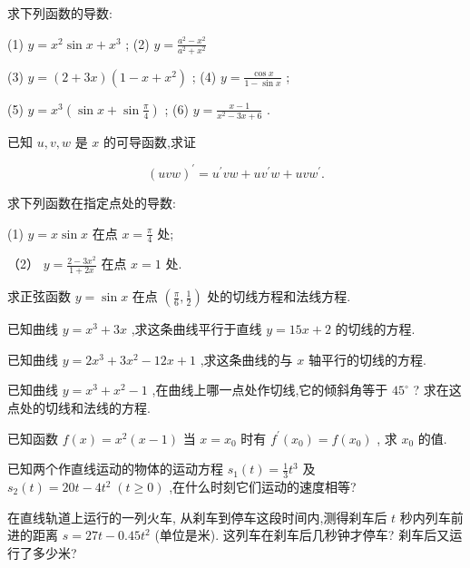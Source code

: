 \documentclass[lang=cn,newtx,10pt,scheme=chinese]{elegantbook}
\begin{document}
\begin{problemset}[习 题 五]

\item 求下列函数的导数:

(1) \(y = {x}^{2}\sin x + {x}^{3}\) ; (2) \(y = \frac{{a}^{2} - {x}^{2}}{{a}^{2} + {x}^{2}}\)

(3) \(y = \left( {2 + {3x}}\right) \left( {1 - x + {x}^{2}}\right)\) ; (4) \(y = \frac{\cos x}{1 - \sin x}\) ;

(5) \(y = {x}^{3}\left( {\sin x + \sin \frac{\pi }{4}}\right)\) ; (6) \(y = \frac{x - 1}{{x}^{2} - {3x} + 6}\) .

\item 已知 \(u,v,w\) 是 \(x\) 的可导函数,求证

\[
{\left( uvw\right) }^{\prime } = {u}^{\prime }{vw} + u{v}^{\prime }w + {uv}{w}^{\prime }.
\]

\item 求下列函数在指定点处的导数:

(1) \(y = x\sin x\) 在点 \(x = \frac{\pi }{4}\) 处;

（2） \(y = \frac{2 - 3{x}^{2}}{1 + {2x}}\) 在点 \(x = 1\) 处.

\item 求正弦函数 \(y = \sin x\) 在点 \(\left( {\frac{\pi }{6},\frac{1}{2}}\right)\) 处的切线方程和法线方程.

\item 已知曲线 \(y = {x}^{3} + {3x}\) ,求这条曲线平行于直线 \(y = {15x} + 2\) 的切线的方程.

\item 已知曲线 \(y = 2{x}^{3} + 3{x}^{2} - {12x} + 1\) ,求这条曲线的与 \(x\) 轴平行的切线的方程.

\item 已知曲线 \(y = {x}^{3} + {x}^{2} - 1\) ,在曲线上哪一点处作切线,它的倾斜角等于 \({45}^{ \circ }\) ? 求在这点处的切线和法线的方程.

\item 已知函数 \(f\left( x\right) = {x}^{2}\left( {x - 1}\right)\) 当 \(x = {x}_{0}\) 时有 \({f}^{\prime }\left( {x}_{0}\right) = f\left( {x}_{0}\right)\) , 求 \({x}_{0}\) 的值.

\item 已知两个作直线运动的物体的运动方程 \({s}_{1}\left( t\right) = \frac{1}{3}{t}^{3}\) 及 \({s}_{2}\left( t\right) = {20t} - 4{t}^{2}\;\left( {t \geq 0}\right)\) ,在什么时刻它们运动的速度相等?

\item 在直线轨道上运行的一列火车, 从刹车到停车这段时间内,测得刹车后 \(t\) 秒内列车前进的距离 \(s = {27t} - {0.45}{t}^{2}\) (单位是米). 这列车在刹车后几秒钟才停车? 刹车后又运行了多少米?


\end{problemset}
\end{document}
